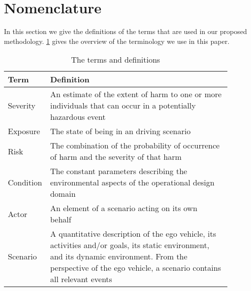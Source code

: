 \section{Nomenclature} %
\label{sec:definitions}

In this section we give the definitions of the terms that are used in our proposed methodology. 
\cref{Tab:Terms} gives the overview of the terminology we use in this paper. 



\begin{table}
	\centering
	\caption{The terms and definitions}
	\begin{tabular}{p{0.1\linewidth} p{0.8\linewidth}} \hline
		\textbf{Term} & \textbf{Definition} \\ \hline
		Severity & An estimate of the extent of harm to one or more individuals that can occur in a potentially hazardous event~\cite{ISO26262} \\
		Exposure & The state of being in an driving scenario \\
		Risk & The combination of the probability of occurrence of harm and the severity of that harm~\cite{ISO26262} \\ 
		Condition & The constant parameters describing the environmental aspects of the operational design domain \\
		Actor & An element of a scenario acting on its own behalf~\cite{} \\ 
		Scenario & A quantitative description of the ego vehicle, its activities and/or goals, its static environment, and its dynamic environment. From the perspective of the ego vehicle, a scenario contains all relevant events \\ \hline
	\end{tabular}
	\label{Tab:Terms}
\end{table}